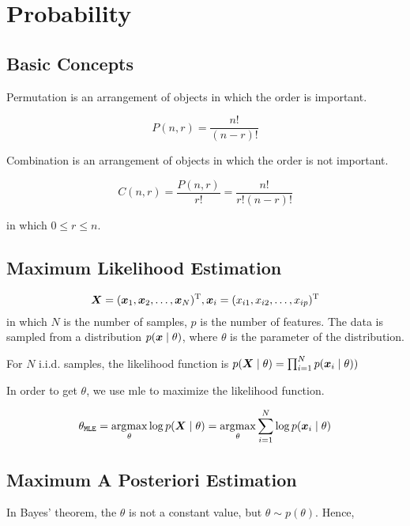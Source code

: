 \chapter{Probability}\label{chp:Probability}
\minitoc

\section{Basic Concepts}


Permutation is an arrangement of objects in which the order is important.

\[
	P\left(n,r\right)=  \frac{n!}{\left(n-r\right)!}
\]

Combination is an arrangement of objects in which the order is not important.


\[
	C\left(n,r\right) = \frac{P\left(n,r\right)}{r!} = \frac{n!}{r!\left(n-r\right)!}
\]

in which \(0 \le r \le n\).


\section{Maximum Likelihood Estimation}

\begin{equation}
	\vX = (\vx_1, \vx_2, \dots, \vx_N)\transp, \vx_i = (x_{i1}, x_{i2},\dots, x_{ip})\transp
\end{equation}
in which $N$ is the number of samples, $p$ is the number of features.
The data is sampled from a distribution $p\giventhat{\vx}{\theta}$, where $\theta$ is the parameter of the distribution.


For \(N\)  i.i.d. samples, the likelihood function is \(p \giventhat{\vX}{\theta} = \prod_{i=1}^{N} p \giventhat{\vx_i}{\theta}) \)

In order to get \(\theta\), we use \gls{mle}  to maximize the likelihood function.

\begin{equation}
	\theta_{\mathtt{MLE}} = \argmax_{\theta} \log p\giventhat{\vX}{\theta} = \argmax_{\theta} \sum_{i=1}^{N} \log p\giventhat{\vx_i}{\theta}
\end{equation}

\section{Maximum A Posteriori Estimation}
In Bayes' theorem, the \(\theta\) is not a constant value, but \(\theta \sim  p(\theta) \).
Hence,

